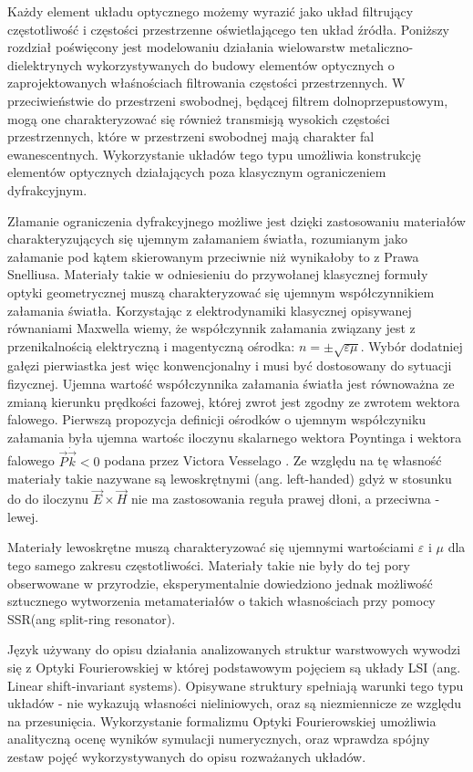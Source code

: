 Każdy element układu optycznego możemy wyrazić jako układ filtrujący częstotliwość i częstości przestrzenne oświetlającego ten układ źródła. Poniższy rozdział poświęcony jest modelowaniu działania wielowarstw metaliczno-dielektrynych wykorzystywanych do  budowy elementów optycznych o zaprojektowanych właśnościach filtrowania częstości przestrzennych. W przeciwieństwie do przestrzeni swobodnej, będącej filtrem dolnoprzepustowym, mogą one charakteryzować się również transmisją wysokich częstości przestrzennych, które w przestrzeni swobodnej mają charakter fal ewanescentnych. Wykorzystanie układów tego typu umożliwia konstrukcję elementów optycznych działających poza klasycznym ograniczeniem dyfrakcyjnym.

Złamanie ograniczenia dyfrakcyjnego możliwe jest dzięki zastosowaniu materiałów charakteryzujących się ujemnym załamaniem światła, rozumianym jako załamanie pod kątem skierowanym przeciwnie niż wynikałoby to z Prawa Snelliusa. Materiały takie w odniesieniu do przywołanej klasycznej formuły optyki geometrycznej muszą charakteryzować się ujemnym współczynnikiem załamania światła. Korzystając z elektrodynamiki klasycznej opisywanej równaniami Maxwella wiemy, że współczynnik załamania związany jest z przenikalnością elektryczną i magentyczną ośrodka: $n = \pm \sqrt{ \varepsilon \mu}$. Wybór dodatniej gałęzi pierwiastka jest więc konwencjonalny i musi być dostosowany do sytuacji fizycznej. Ujemna wartość współczynnika załamania światła jest równoważna ze zmianą kierunku prędkości fazowej, której zwrot jest zgodny ze zwrotem wektora falowego. Pierwszą propozycja definicji ośrodków o ujemnym współczyniku załamania była ujemna wartośc iloczynu skalarnego wektora Poyntinga i wektora falowego $\vec{P} \dot \vec{k} < 0$ podana przez Victora Vesselago \cite{veselago1968electrodynamics}. Ze względu na tę własność materiały takie nazywane są lewoskrętnymi (ang. left-handed) gdyż w stosunku do do iloczynu $\vec{E} \times \vec{H}$ nie ma zastosowania reguła prawej dłoni, a przeciwna - lewej.

Materiały lewoskrętne muszą charakteryzować się ujemnymi wartościami $\varepsilon$ i $\mu$ dla tego samego zakresu częstotliwości. Materiały takie nie były do tej pory obserwowane w przyrodzie, eksperymentalnie dowiedziono jednak możliwość sztucznego wytworzenia metamateriałów o takich własnościach\cite{PhysRevLett.84.4184} przy pomocy SSR(ang split-ring resonator). 

Język używany do opisu działania analizowanych struktur warstwowych wywodzi się z Optyki Fourierowskiej w której podstawowym pojęciem są układy LSI (ang. Linear shift-invariant systems). Opisywane struktury spełniają warunki tego typu układów - nie wykazują własności nieliniowych, oraz są niezmiennicze ze względu na przesunięcia. Wykorzystanie formalizmu Optyki Fourierowskiej umożliwia analityczną ocenę wyników symulacji numerycznych, oraz wprawdza spójny zestaw pojęć wykorzystywanych do opisu rozważanych układów.

